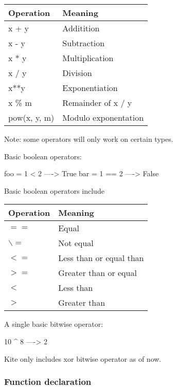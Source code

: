 \begin{table}[H]
\centering
    \begin{tabular}{|l|l|}
    \hline
    Operation    & Meaning              \\ \hline
    x + y        & Additition           \\ \hline
    x - y        & Subtraction          \\ \hline
    x * y        & Multiplication       \\ \hline
    x / y        & Division             \\ \hline
    x**y         & Exponentiation       \\ \hline
    x \% m       & Remainder of x / y   \\ \hline
    pow(x, y, m) & Modulo exponentation \\ \hline
    \end{tabular}
\end{table}
Note: some operators will only work on certain types.

Basic boolean operators:
\begin{kite}

foo = 1 < 2  ----> True
bar = 1 == 2 ----> False
\end{kite}
Basic boolean operators include 
\begin{table}[H]
\centering
    \begin{tabular}{|l|l|}
    \hline
    Operation & Meaning                 \\ \hline
    $==$        & Equal                   \\ \hline
    $\backslash=$        & Not equal               \\ \hline
    $<=$        & Less than or equal than \\ \hline
    $>=$        & Greater than or equal   \\ \hline
    $<$         & Less than               \\ \hline
    $>$         & Greater than            \\ \hline
    \end{tabular}
\end{table}

A single basic bitwise operator:
\begin{kite}

10 ^ 8 ----> 2
\end{kite}
Kite only includes xor bitwise operator as of now.

\subsubsection{Function declaration}

